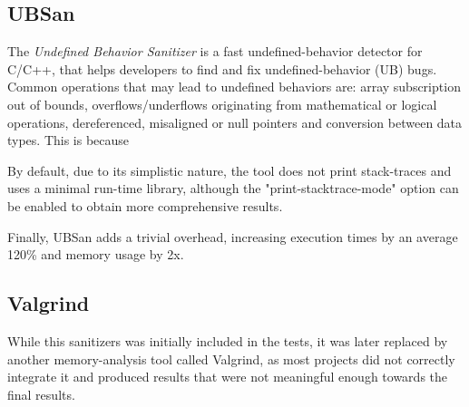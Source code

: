 \subsection{UBSan}
The \textit{Undefined Behavior Sanitizer} \cite{ubsan_docs} is a fast undefined-behavior detector for C/C++, that helps developers to find and fix undefined-behavior (UB) bugs. Common operations that may lead to undefined behaviors are: array subscription out of bounds, overflows/underflows originating from mathematical or logical operations, dereferenced, misaligned or null pointers and conversion between data types. This is because 

By default, due to its simplistic nature, the tool does not print stack-traces and uses a minimal run-time library, although the "print-stacktrace-mode" option can be enabled to obtain more comprehensive results.


Finally, UBSan adds a trivial overhead, increasing execution times by an average 120\% and memory usage by 2x. \cite{ubsan_docs}







\newpage
{}

\subsection{Valgrind}

While this sanitizers was initially included in the tests, it was later replaced by another memory-analysis tool called Valgrind, as most projects did not correctly integrate it and produced results that were not meaningful enough towards the final results.





